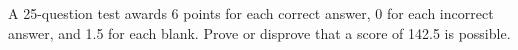 A 25-question test awards 6 points for each correct answer, 0 for each incorrect answer, and 1.5 for each blank. Prove or disprove that a score of 142.5 is possible.
